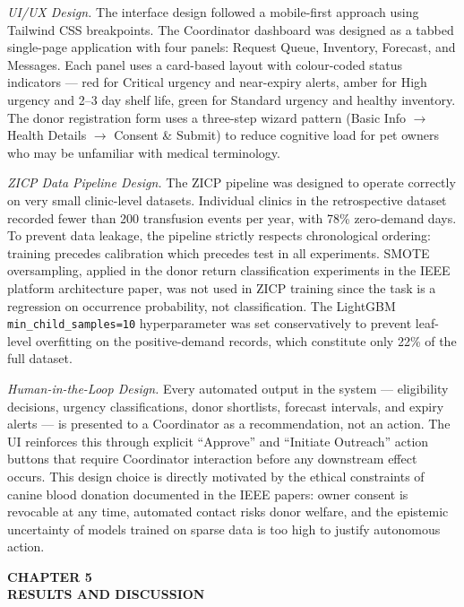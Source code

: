 \documentclass[12pt,a4paper]{article}
\begin{document}
\noindent\textit{UI/UX Design.} The interface design followed a mobile-first approach using Tailwind CSS breakpoints. The Coordinator dashboard was designed as a tabbed single-page application with four panels: Request Queue, Inventory, Forecast, and Messages. Each panel uses a card-based layout with colour-coded status indicators — red for Critical urgency and near-expiry alerts, amber for High urgency and 2--3 day shelf life, green for Standard urgency and healthy inventory. The donor registration form uses a three-step wizard pattern (Basic Info $\rightarrow$ Health Details $\rightarrow$ Consent \& Submit) to reduce cognitive load for pet owners who may be unfamiliar with medical terminology.

\noindent\textit{ZICP Data Pipeline Design.} The ZICP pipeline was designed to operate correctly on very small clinic-level datasets. Individual clinics in the retrospective dataset recorded fewer than 200 transfusion events per year, with 78\% zero-demand days. To prevent data leakage, the pipeline strictly respects chronological ordering: training precedes calibration which precedes test in all experiments. SMOTE oversampling, applied in the donor return classification experiments in the IEEE platform architecture paper, was not used in ZICP training since the task is a regression on occurrence probability, not classification. The LightGBM \texttt{min\_child\_samples=10} hyperparameter was set conservatively to prevent leaf-level overfitting on the positive-demand records, which constitute only 22\% of the full dataset.

\noindent\textit{Human-in-the-Loop Design.} Every automated output in the system — eligibility decisions, urgency classifications, donor shortlists, forecast intervals, and expiry alerts — is presented to a Coordinator as a recommendation, not an action. The UI reinforces this through explicit ``Approve'' and ``Initiate Outreach'' action buttons that require Coordinator interaction before any downstream effect occurs. This design choice is directly motivated by the ethical constraints of canine blood donation documented in the IEEE papers: owner consent is revocable at any time, automated contact risks donor welfare, and the epistemic uncertainty of models trained on sparse data is too high to justify autonomous action.

\newpage
\begin{center}
    \textbf{\large CHAPTER 5}\\[0.4em]
    \textbf{\large RESULTS AND DISCUSSION}
\end{center}
\vspace{1.5em}
\end{document}
